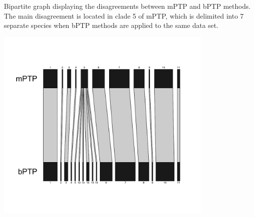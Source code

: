 \documentclass[11pt]{article}
\begin{document}
\begin{suppfigure}
\centering
\caption{
Bipartite graph displaying the disagreements between mPTP and bPTP methods. The main disagreement is located in clade 5 of mPTP, which is delimited into 7 separate species when bPTP methods are applied to the same data set.
}
\includegraphics[width=0.8\textwidth]{supplementaryinfo/web.mPTP.bPTP-edited.pdf}
\label{fig:genetree5}
\end{suppfigure}
\clearpage
%
\end{document}
